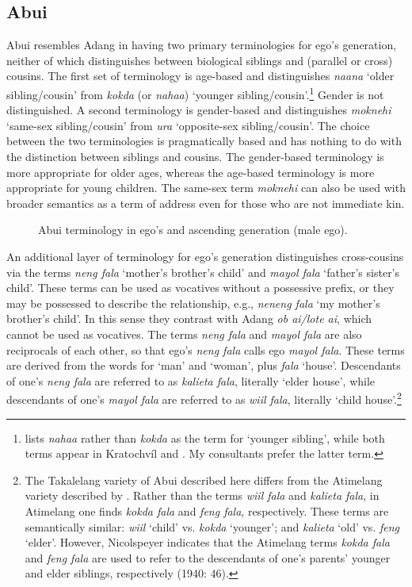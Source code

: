 \subsection{Abui}
Abui resembles Adang in having two primary terminologies for ego's generation, neither of which distinguishes between biological siblings and (parallel or cross) cousins. The first set of terminology is age-based and distinguishes \textit{naana} `older sibling/cousin' from \textit{kokda} (or \textit{nahaa}) `younger sibling/cousin'.\footnote{{ }  \citet[56]{Nicolspeyer1940} lists \textit{nahaa} rather than \textit{kokda} as the term for `younger sibling', while both terms appear in Kratochv\'il and \citet{Delpada2008}. My consultants prefer the latter term.}  Gender is not distinguished. A second terminology is gender-based and distinguishes \textit{moknehi} `same-sex sibling/cousin' from \textit{ura} `opposite-sex sibling/cousin'. The choice between the two terminologies is pragmatically based and has nothing to do with the distinction between siblings and cousins. The gender-based terminology is more appropriate for older ages, whereas the age-based terminology is more appropriate for young children. The same-sex term \textit{moknehi} can also be used with broader semantics as a term of address even for those who are not immediate kin.

\begin{figure}
\caption{Abui terminology in ego's and ascending generation (male ego). }
\end{figure}

An additional layer of terminology for ego's generation distinguishes cross-cousins via the terms \textit{neng fala} `mother's brother's child' and \textit{mayol fala} `father's sister's child'. These terms can be used as vocatives without a possessive prefix, or they may be possessed to describe the relationship, e.g., \textit{neneng fala} `my mother's brother's child'. In this sense they contrast with Adang \textit{ob ai/lote ai}, which cannot be used as vocatives. The terms \textit{neng fala} and \textit{mayol fala} are also reciprocals of each other, so that ego's \textit{neng fala} calls ego \textit{mayol fala}. These terms are derived from the words for `man' and `woman', plus \textit{fala} `house'. Descendants of one's \textit{neng fala} are referred to as \textit{kalieta fala}, literally `elder house', while descendants of one's \textit{mayol fala} are referred to as \textit{wiil fala}, literally `child house'.\footnote{{ }  The Takalelang variety of Abui described here differs from the Atimelang variety described by \citet{Nicolspeyer1940}. Rather than the terms \textit{wiil fala} and \textit{kalieta fala}, in Atimelang one finds \textit{kokda fala} and \textit{feng fala}, respectively. These terms are semantically similar: \textit{wiil} `child' vs. \textit{kokda} `younger'; and \textit{kalieta} `old' vs. \textit{feng} `elder'. However, Nicolspeyer indicates that the Atimelang terms \textit{kokda fala} and \textit{feng fala} are used to refer to the descendants of one's parents' younger and elder siblings, respectively (1940: 46).}

